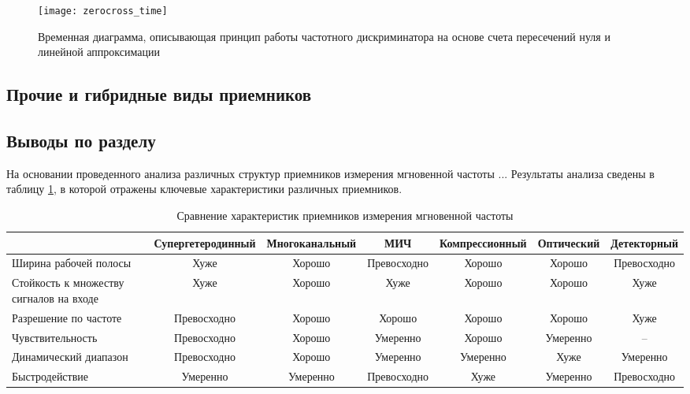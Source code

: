 \begin{figure}[ht]
	\centering
	\texttt{[image: zerocross\_time]}
	
	\caption{Временная диаграмма, описывающая принцип работы частотного дискриминатора на основе счета пересечений нуля и линейной аппроксимации}
	\label{ct:zerocross_time}
\end{figure}

\subsection{Прочие и гибридные виды приемников}

\subsection{Выводы по разделу}

На основании проведенного анализа различных структур приемников измерения мгновенной частоты ...
Результаты анализа сведены в таблицу \ref{t:survey}, в которой отражены ключевые характеристики различных приемников.

\begin{table}
\caption{Сравнение характеристик приемников измерения мгновенной частоты\label{t:survey}}
	\begin{adjustbox}{width=\columnwidth,center}
		
		\begin{tabular}{@{}m{8em}cccccc@{}}
			\toprule
													&	Супергетеродинный	& Многоканальный & МИЧ & Компрессионный & Оптический & Детекторный\\
			\midrule
			Ширина рабочей полосы					&	Хуже 				& Хорошо	& Превосходно	& Хорошо & Хорошо & Превосходно\\
			Стойкость к множеству сигналов на входе &	Хуже 				& Хорошо	& Хуже	& Хорошо & Хорошо & Хуже\\
			Разрешение по частоте 					& 	Превосходно 		& Хорошо	& Хорошо	& Хорошо & Хорошо & Хуже\\
			Чувствительность 						& 	Превосходно 		& Хорошо	& Умеренно	& Хорошо & Умеренно & --\\
			Динамический диапазон 					& 	Превосходно 		& Хорошо	& Умеренно	& Умеренно & Хуже & Умеренно\\
			Быстродействие							&	Умеренно			& Умеренно	& Превосходно & Хуже	& Умеренно & Превосходно \\
			\bottomrule
		\end{tabular}
	\end{adjustbox}
\end{table}


